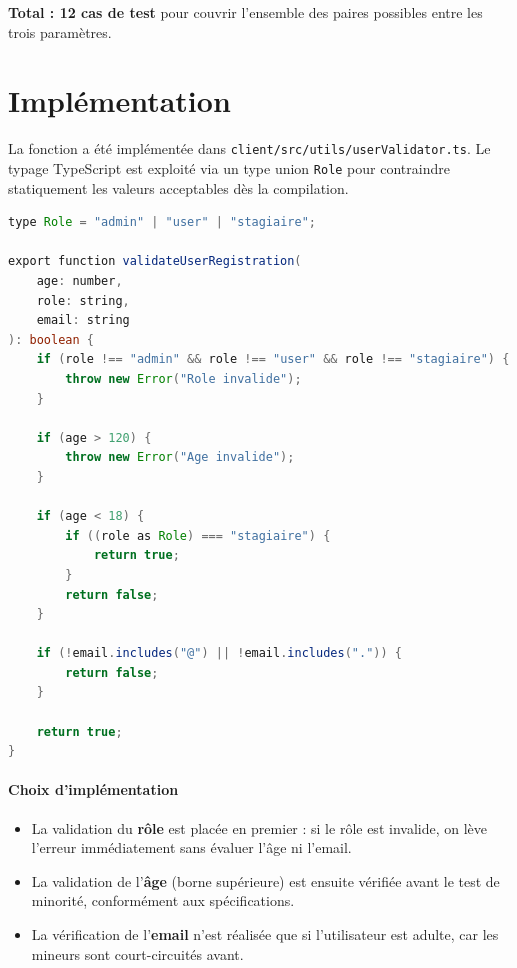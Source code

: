 \documentclass[11pt,a4paper]{article}
\begin{document}
\textbf{Total : 12 cas de test} pour couvrir l'ensemble des paires possibles entre les trois paramètres.

\section{Implémentation}

La fonction a été implémentée dans \texttt{client/src/utils/userValidator.ts}.
Le typage TypeScript est exploité via un type union \texttt{Role} pour contraindre
statiquement les valeurs acceptables dès la compilation.

\begin{lstlisting}[language=Java, caption={client/src/utils/userValidator.ts}]
type Role = "admin" | "user" | "stagiaire";

export function validateUserRegistration(
    age: number,
    role: string,
    email: string
): boolean {
    if (role !== "admin" && role !== "user" && role !== "stagiaire") {
        throw new Error("Role invalide");
    }

    if (age > 120) {
        throw new Error("Age invalide");
    }

    if (age < 18) {
        if ((role as Role) === "stagiaire") {
            return true;
        }
        return false;
    }

    if (!email.includes("@") || !email.includes(".")) {
        return false;
    }

    return true;
}
\end{lstlisting}

\paragraph{Choix d'implémentation}
\begin{itemize}
  \item La validation du \textbf{rôle} est placée en premier : si le rôle est invalide,
        on lève l'erreur immédiatement sans évaluer l'âge ni l'email.
  \item La validation de l'\textbf{âge} (borne supérieure) est ensuite vérifiée avant
        le test de minorité, conformément aux spécifications.
  \item La vérification de l'\textbf{email} n'est réalisée que si l'utilisateur est adulte,
        car les mineurs sont court-circuités avant.
\end{itemize}
\end{document}
